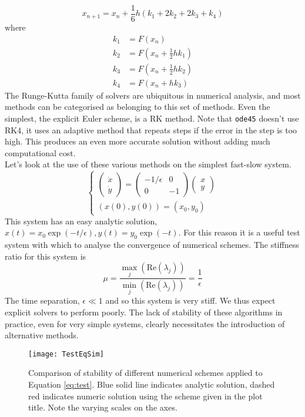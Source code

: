 $$ x_{n+1} = x_n +\frac{1}{6} h \left(k_1+2k_2+2k_3+k_4\right)$$
where
\begin{align*}
k_1 &= F(x_n)\\
k_2 &= F\left(x_n+\frac{1}{2}hk_1\right)\\
k_3 &= F\left(x_n +\frac{1}{2}hk_2\right)\\
k_4 &= F\left(x_n + hk_3\right)
\end{align*}
The Runge-Kutta family of solvers are ubiquitous in numerical analysis, and most methods can be categorised as belonging to this set of methods. Even the simplest, the explicit Euler scheme, is a RK method. Note that \texttt{ode45} doesn't use RK4, it uses an adaptive method that repeats steps if the error in the step is too high. This produces an even more accurate solution without adding much computational cost. \\

Let's look at the use of these various methods on the simplest fast-slow system.
		\begin{equation} \begin{cases}
		\begin{pmatrix} \dot{x}\\\dot{y}\end{pmatrix}=\begin{pmatrix}
		-1/\epsilon & 0 \\
		0& -1
		\end{pmatrix}\begin{pmatrix}
		x\\y 
		\end{pmatrix}\\
		(x(0),y(0))= (x_0,y_0)
		\end{cases}\label{eq:test}\end{equation}
This system has an easy analytic solution, $x(t) = x_0\exp(-t/\epsilon), y(t)=y_0 \exp(-t)$. For this reason it is a useful test system with which to analyse the convergence of numerical schemes. The stiffness ratio for this system is
$$ \mu =\frac{\max_j(\mathrm{Re}(\lambda_j))}{\min_j(\mathrm{Re}(\lambda_j))}= \frac{1}{\epsilon} $$
The time separation, $\epsilon \ll 1$ and so this system is very stiff. We thus expect explicit solvers to perform poorly. The lack of stability of these algorithms in practice, even for very simple systems, clearly necessitates the introduction of alternative methods.
\begin{figure}
	\centering
	\texttt{[image: TestEqSim]}
	\caption[Numerical Stability Comparison]{Comparison of stability of different numerical schemes applied to Equation \ref{eq:test}. Blue solid line indicates analytic solution, dashed red indicates numeric solution using the scheme given in the plot title. Note the varying scales on the axes.}
	\label{fig:numstab}
\end{figure}\newpage


